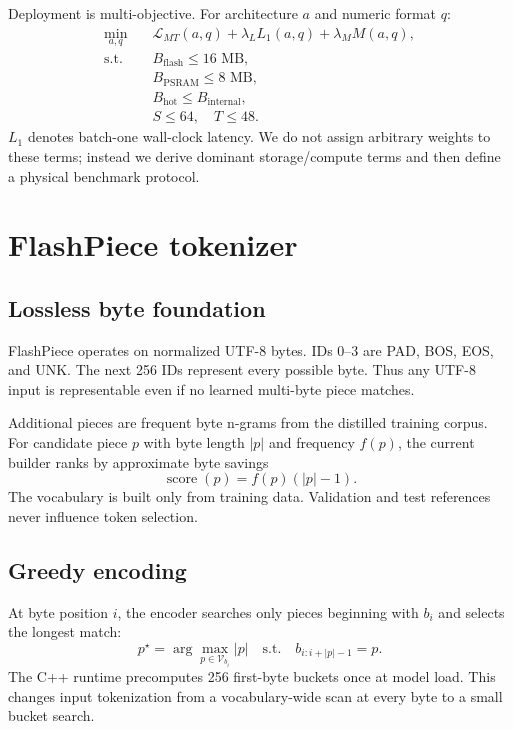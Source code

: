 \documentclass{article}
\begin{document}
Deployment is multi-objective. For architecture $a$ and numeric format $q$:
\begin{align}
\min_{a,q}\quad
&\mathcal{L}_{MT}(a,q)+\lambda_L L_1(a,q)+\lambda_M M(a,q),\\
\text{s.t.}\quad
&B_{\mathrm{flash}}\le 16\text{ MB},\\
&B_{\mathrm{PSRAM}}\le 8\text{ MB},\\
&B_{\mathrm{hot}}\le B_{\mathrm{internal}},\\
&S\le 64,\quad T\le48.
\end{align}
$L_1$ denotes batch-one wall-clock latency. We do not assign arbitrary weights to these terms; instead we derive dominant storage/compute terms and then define a physical benchmark protocol.

\section{FlashPiece tokenizer}
\subsection{Lossless byte foundation}
FlashPiece operates on normalized UTF-8 bytes. IDs 0--3 are PAD, BOS, EOS, and UNK. The next 256 IDs represent every possible byte. Thus any UTF-8 input is representable even if no learned multi-byte piece matches.

Additional pieces are frequent byte n-grams from the distilled training corpus. For candidate piece $p$ with byte length $|p|$ and frequency $f(p)$, the current builder ranks by approximate byte savings
\begin{equation}
\operatorname{score}(p)=f(p)(|p|-1).
\end{equation}
The vocabulary is built only from training data. Validation and test references never influence token selection.

\subsection{Greedy encoding}
At byte position $i$, the encoder searches only pieces beginning with $b_i$ and selects the longest match:
\begin{equation}
p^\star=\arg\max_{p\in\mathcal{V}_{b_i}} |p|
\quad\text{s.t.}\quad b_{i:i+|p|-1}=p.
\end{equation}
The C++ runtime precomputes 256 first-byte buckets once at model load. This changes input tokenization from a vocabulary-wide scan at every byte to a small bucket search.
\end{document}
